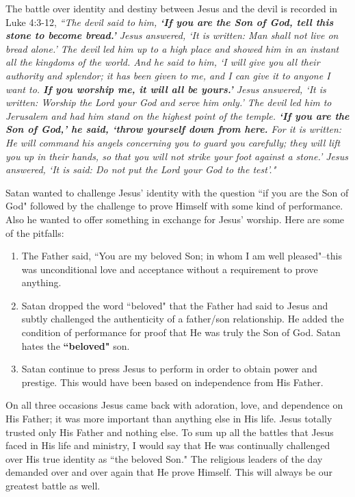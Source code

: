 \documentclass[oneside]{book}
\begin{document}
The battle over identity and destiny between Jesus and the devil is recorded in Luke 4:3-12, \textit{``The devil said to him, \textbf{`If you are the Son of God, tell this stone to become bread.'} Jesus answered, `It is written: Man shall not live on bread alone.' The devil led him up to a high place and showed him in an instant all the kingdoms of the world.  And he said to him, `I will give you all their authority and splendor; it has been given to me, and I can give it to anyone I want to. \textbf{If you worship me, it will all be yours.'} Jesus answered, `It is written: Worship the Lord your God and serve him only.' The devil led him to Jerusalem and had him stand on the highest point of the temple. \textbf{`If you are the Son of God,' he said, `throw yourself down from here.} For it is written: He will command his angels concerning you to guard you carefully; they will lift you up in their hands, so that you will not strike your foot against a stone.' Jesus answered, `It is said: Do not put the Lord your God to the test'."}

Satan wanted to challenge Jesus' identity with the question ``if you are the Son of God" followed by the challenge to prove Himself with some kind of performance. Also he wanted to offer something in exchange for Jesus' worship. Here are some of the pitfalls:

\begin{enumerate}
	\item The Father said, ``You are my beloved Son; in whom I am well pleased"--this was unconditional love and acceptance without a requirement to prove anything.
	\item Satan dropped the word ``beloved" that the Father had said to Jesus and subtly challenged the authenticity of a father/son relationship. He added the condition of performance for proof that He was truly the Son of God. Satan hates the \textbf{``beloved"} son.
	\item Satan continue to press Jesus to perform in order to obtain power and prestige. This would have been based on independence from His Father.
\end{enumerate}

On all three occasions Jesus came back with adoration, love, and dependence on His Father; it was more important than anything else in His life. Jesus totally trusted only His Father and nothing else. To sum up all the battles that Jesus faced in His life and ministry, I would say that He was continually challenged over His true identity as ``the beloved Son." The religious leaders of the day demanded over and over again that He prove Himself. This will always be our greatest battle as well. 
\end{document}
